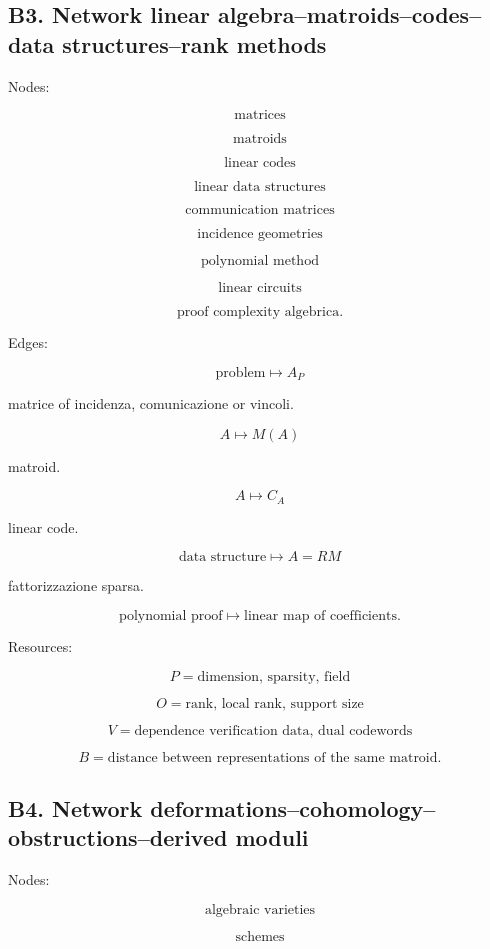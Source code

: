 \documentclass[11pt]{article}
\begin{document}
\subsection{B3. Network linear algebra--matroids--codes--data structures--rank methods}

Nodes:

\[
\text{matrices}
\]

\[
\text{matroids}
\]

\[
\text{linear codes}
\]

\[
\text{linear data structures}
\]

\[
\text{communication matrices}
\]

\[
\text{incidence geometries}
\]

\[
\text{polynomial method}
\]

\[
\text{linear circuits}
\]

\[
\text{proof complexity algebrica}.
\]

Edges:

\[
\text{problem}\mapsto A_P
\]

matrice of incidenza, comunicazione or vincoli.

\[
A\mapsto M(A)
\]

matroid.

\[
A\mapsto C_A
\]

linear code.

\[
\text{data structure}\mapsto A=RM
\]

fattorizzazione sparsa.

\[
\text{polynomial proof}\mapsto \text{linear map of coefficients}.
\]

Resources:

\[
P=\text{dimension, sparsity, field}
\]

\[
O=\text{rank, local rank, support size}
\]

\[
V=\text{dependence verification data, dual codewords}
\]

\[
B=\text{distance between representations of the same matroid}.
\]



\subsection{B4. Network deformations--cohomology--obstructions--derived moduli}

Nodes:

\[
\text{algebraic varieties}
\]

\[
\text{schemes}
\]
\end{document}
